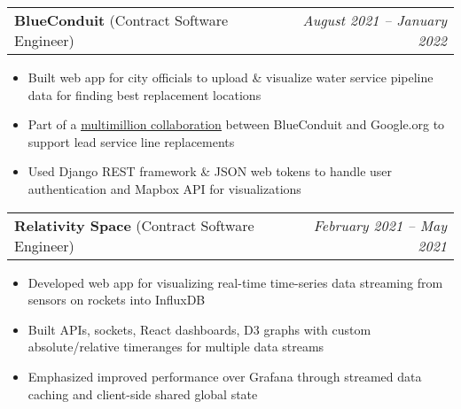 \documentclass[letterpaper,11pt]{article}
\makeatletter
\newcommand{\resumeItem}[1]{
  \item\small{
    {#1 \vspace{-4pt}}
  }
}
\newcommand{\resumeSubheading}[4]{
  \vspace{-2pt}\item
    \begin{tabular*}{0.97\textwidth}[t]{l@{\extracolsep{\fill}}r}
      \textbf{#1} & #2 \\
      \textit{\small#3} & \textit{\small #4} \\
    \end{tabular*}\vspace{-8pt}
}
\newcommand{\resumeProjectHeading}[2]{
    \item
    \begin{tabular*}{0.97\textwidth}{l@{\extracolsep{\fill}}r}
      \small#1 & \emph{#2} \\
    \end{tabular*}\vspace{-8pt}
}
\newcommand{\resumeItemListStart}{\begin{itemize}[leftmargin=0.2in]}
\newcommand{\resumeItemListEnd}{\end{itemize}\vspace{-5pt}}
\makeatother
\begin{document}

    \resumeProjectHeading
    {\textbf{BlueConduit} (Contract Software Engineer)}{August 2021 – January 2022}
    \resumeItemListStart
        \resumeItem{Built web app for city officials to upload \& visualize water service pipeline data for finding best replacement locations}
        \resumeItem{Part of a \href{https://www.nrdc.org/press-releases/blueconduit-and-googleorg-announce-coalition-help-communities-quantify-and-locate}{\underline{multimillion collaboration}} between BlueConduit and Google.org to support lead service line replacements}
        \resumeItem{Used Django REST framework \& JSON web tokens to handle user authentication and Mapbox API for visualizations}
    \resumeItemListEnd

    \resumeProjectHeading
    {\textbf{Relativity Space} (Contract Software Engineer)}{February 2021 – May 2021}
        \resumeItemListStart
            \resumeItem{Developed web app for visualizing real-time time-series data streaming from sensors on rockets into InfluxDB}
            \resumeItem{Built APIs, sockets, React dashboards, D3 graphs with custom absolute/relative timeranges for multiple data streams}
            \resumeItem{Emphasized improved performance over Grafana through streamed data caching and client-side shared global state}
        \resumeItemListEnd

\end{document}
